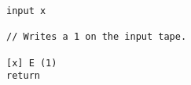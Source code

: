 { \tiny
\begin{lstlisting}
input x

// Writes a 1 on the input tape.

[x] E (1)
return
\end{lstlisting}
}

